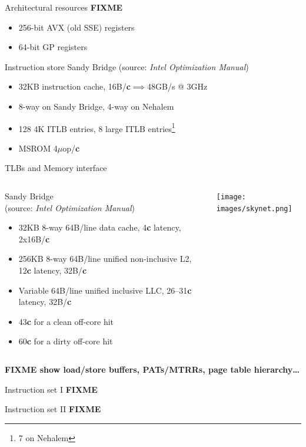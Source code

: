 \documentclass[mathserif,xcolor={dvipsnames,table}]{beamer}
\begin{document}
\begin{frame}{Architectural resources}
\huge\textbf{FIXME}
\begin{itemize}
\item 256-bit AVX (old SSE) registers
\item 64-bit GP registers
\end{itemize}
\end{frame}

\begin{frame}{Instruction store}
Sandy Bridge (source: \textit{Intel Optimization Manual})
\begin{itemize}
\item 32KB instruction cache, 16B/\textbf{c}$\implies$48GB/s @ 3GHz
\item 8-way on Sandy Bridge, 4-way on Nehalem
\item 128 4K ITLB entries, 8 large ITLB entries\footnote{7 on Nehalem}
\item MSROM 4$\mu$op/\textbf{c}
\end{itemize}
\end{frame}

\begin{frame}{TLBs and Memory interface}
\begin{columns}
\begin{column}{0.5\textwidth}
Sandy Bridge\\ \small{(source: \textit{Intel Optimization Manual})}
\begin{itemize}
\item 32KB 8-way 64B/line data cache, 4\textbf{c} latency, 2x16B/\textbf{c}
\item 256KB 8-way 64B/line unified non-inclusive L2, 12\textbf{c} latency, 32B/\textbf{c}
\item Variable 64B/line unified inclusive LLC, 26--31\textbf{c} latency, 32B/\textbf{c}
\item 43\textbf{c} for a clean off-core hit
\item 60\textbf{c} for a dirty off-core hit
\end{itemize}
\end{column}
\begin{column}{0.5\textwidth}
\texttt{[image: images/skynet.png]}
\end{column}
\end{columns}
\textbf{FIXME show load/store buffers, PATs/MTRRs, page table hierarchy\ldots}
\end{frame}

\begin{frame}{Instruction set I}
\huge\textbf{FIXME}
\end{frame}

\begin{frame}{Instruction set II}
\huge\textbf{FIXME}
\end{frame}
\end{document}
